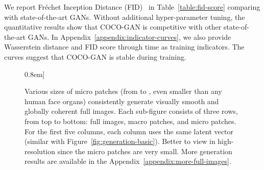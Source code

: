 \documentclass{article}
\newcommand{\modelName}{COCO-GAN }
\begin{document}
        \label{exp:fid-score}
        
        We report Fréchet Inception Distance (FID)~\cite{fid} in Table~\ref{table:fid-score} comparing with state-of-the-art GANs. Without additional hyper-parameter tuning, the quantitative results show that \modelName is competitive with other state-of-the-art GANs. In Appendix~\ref{appendix:indicator-curves}, we also provide Wasserstein distance and FID score through time as training indicators. The curves suggest that \modelName is stable during training.
        
        \begin{figure}[t!]
             \-0.8em]
\caption{Various sizes of micro patches (from  to , even smaller than any human face organs) consistently generate visually smooth and globally coherent full images. Each sub-figure consists of three rows, from top to bottom: full images, macro patches, and micro patches. For the first five columns, each column uses the same latent vector (similar with Figure~\ref{fig:generation-basic}). Better to view in high-resolution since the micro patches are very small. More generation results are available in the Appendix~\ref{appendix:more-full-images}.}
            \label{fig:generation-crazy}
            \vspace{-0.5em}
        \end{figure}
        
\end{document}
